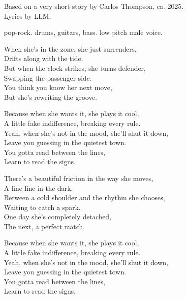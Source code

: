 

\begin{notes}
Based on a very short story by Carlos Thompson, ca. %
2025.\\
Lyrics by LLM.
\end{notes}
\begin{style}
pop-rock. %
drums, guitars, bass. %
low pitch male voice.
\end{style}
\begin{lyrics}
​When she’s in the zone, she just surrenders,\\
Drifts along with the tide.\\
But when the clock strikes, she turns defender,\\
Swapping the passenger side.\\
You think you know her next move,\\
But she’s rewriting the groove.

​Because when she wants it, she plays it cool,\\
A little fake indifference, breaking every rule.\\
Yeah, when she’s not in the mood, she’ll shut it down,\\
Leave you guessing in the quietest town.\\
You gotta read between the lines,\\
Learn to read the signs.

​There’s a beautiful friction in the way she moves,\\
A fine line in the dark.\\
Between a cold shoulder and the rhythm she chooses,\\
Waiting to catch a spark.\\
One day she’s completely detached,\\
The next, a perfect match.

​Because when she wants it, she plays it cool,\\
A little fake indifference, breaking every rule.\\
Yeah, when she’s not in the mood, she’ll shut it down,\\
Leave you guessing in the quietest town.\\
You gotta read between the lines,\\
Learn to read the signs.


\end{lyrics}
